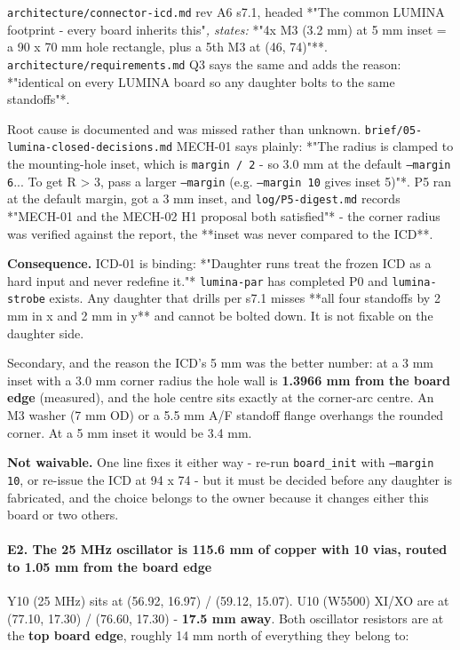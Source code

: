 \documentclass[11pt,a4paper]{article}
\begin{document}
\texttt{architecture/connector-icd.md} rev A6 s7.1, headed {*}"The common LUMINA footprint - every board inherits this"\emph{, states: }{*}"4x M3 (3.2 mm) at 5 mm inset = a 90 x 70 mm hole rectangle, plus a 5th M3 at (46, 74)"{*}{*}. \texttt{architecture/requirements.md} Q3 says the same and adds the reason: {*}"identical on every LUMINA board so any daughter bolts to the same standoffs"{*}.

Root cause is documented and was missed rather than unknown. \texttt{brief/05-lumina-closed-decisions.md} MECH-01 says plainly: {*}"The radius is clamped to the mounting-hole inset, which is \texttt{margin / 2} - so 3.0 mm at the default \texttt{--margin 6}... To get R \textgreater{} 3, pass a larger \texttt{--margin} (e.g. \texttt{--margin 10} gives inset 5)"{*}. P5 ran at the default margin, got a 3 mm inset, and \texttt{log/P5-digest.md} records {*}"MECH-01 and the MECH-02 H1 proposal both satisfied"{*} - the corner radius was verified against the report, the {*}{*}inset was never compared to the ICD{*}{*}.

\textbf{Consequence.} ICD-01 is binding: {*}"Daughter runs treat the frozen ICD as a hard input and never redefine it."{*} \texttt{lumina-par} has completed P0 and \texttt{lumina-strobe} exists. Any daughter that drills per s7.1 misses {*}{*}all four standoffs by 2 mm in x and 2 mm in y{*}{*} and cannot be bolted down. It is not fixable on the daughter side.

Secondary, and the reason the ICD's 5 mm was the better number: at a 3 mm inset with a 3.0 mm corner radius the hole wall is \textbf{1.3966 mm from the board edge} (measured), and the hole centre sits exactly at the corner-arc centre. An M3 washer (7 mm OD) or a 5.5 mm A/F standoff flange overhangs the rounded corner. At a 5 mm inset it would be 3.4 mm.

\textbf{Not waivable.} One line fixes it either way - re-run \texttt{board\_init} with \texttt{--margin 10}, or re-issue the ICD at 94 x 74 - but it must be decided before any daughter is fabricated, and the choice belongs to the owner because it changes either this board or two others.

\paragraph*{E2. The 25 MHz oscillator is 115.6 mm of copper with 10 vias, routed to 1.05 mm from the board edge}
Y10 (25 MHz) sits at (56.92, 16.97) / (59.12, 15.07). U10 (W5500) XI/XO are at (77.10, 17.30) / (76.60, 17.30) - \textbf{17.5 mm away}. Both oscillator resistors are at the \textbf{top board edge}, roughly 14 mm north of everything they belong to:
\end{document}
